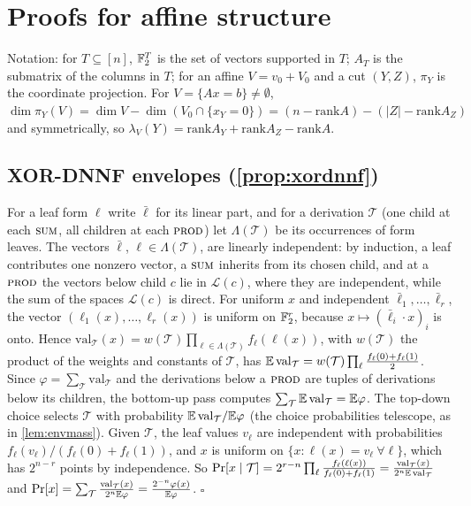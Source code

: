 \section{Proofs for affine structure}\label{app:affine}

Notation: for $T\subseteq[n]$, $\mathbb{F}_2^T$ is the set of vectors supported in $T$; $A_T$
is the submatrix of the columns in $T$; for an affine $V=v_0+V_0$ and a cut $(Y,Z)$,
$\pi_Y$ is the coordinate projection. For $V=\{Ax=b\}\ne\emptyset$,
$\dim\pi_Y(V)=\dim V-\dim(V_0\cap\{x_Y=0\})=(n-\mathrm{rank}A)-(|Z|-\mathrm{rank}A_Z)$
and symmetrically, so
$\lambda_V(Y)=\mathrm{rank}A_Y+\mathrm{rank}A_Z-\mathrm{rank}A$.

\subsection{XOR-DNNF envelopes (\cref{prop:xordnnf})}

For a leaf form $\ell$ write $\bar\ell$ for its linear part, and for a derivation
$\mathcal T$ (one child at each $\textsc{sum}$, all children at each $\textsc{prod}$) let
$\Lambda(\mathcal T)$ be its occurrences of form leaves. The vectors $\bar\ell$,
$\ell\in\Lambda(\mathcal T)$, are linearly independent: by induction, a leaf
contributes one nonzero vector, a $\textsc{sum}$ inherits from its chosen child, and at a
$\textsc{prod}$ the vectors below child $c$ lie in $\mathcal L(c)$, where they are independent,
while the sum of the spaces $\mathcal L(c)$ is direct. For uniform $x$ and independent
$\bar\ell_1,\dots,\bar\ell_r$, the vector $(\ell_1(x),\dots,\ell_r(x))$ is uniform on
$\mathbb{F}_2^r$, because $x\mapsto(\bar\ell_i\cdot x)_i$ is onto. Hence
$\mathrm{val}_{\mathcal T}(x)=w(\mathcal T)\prod_{\ell\in\Lambda(\mathcal T)}f_\ell(\ell(x))$,
with $w(\mathcal T)$ the product of the weights and constants of $\mathcal T$, has
$\mathbb{E}\,\mathrm{val}_{\mathcal T}=w(\mathcal T)\prod_\ell\frac{f_\ell(0)+f_\ell(1)}2$.
Since $\varphi=\sum_{\mathcal T}\mathrm{val}_{\mathcal T}$ and the derivations below a
$\textsc{prod}$ are tuples of derivations below its children, the bottom-up pass computes
$\sum_{\mathcal T}\mathbb{E}\,\mathrm{val}_{\mathcal T}=\mathbb{E}\varphi$. The top-down choice selects
$\mathcal T$ with probability $\mathbb{E}\,\mathrm{val}_{\mathcal T}/\mathbb{E}\varphi$ (the choice
probabilities telescope, as in \cref{lem:envmass}). Given $\mathcal T$, the leaf values
$v_\ell$ are independent with probabilities $f_\ell(v_\ell)/(f_\ell(0)+f_\ell(1))$, and
$x$ is uniform on $\{x:\ell(x)=v_\ell\ \forall\ell\}$, which has $2^{n-r}$ points by
independence. So
$\Pr[x\mid\mathcal T]=2^{r-n}\prod_\ell\frac{f_\ell(\ell(x))}{f_\ell(0)+f_\ell(1)}=
\frac{\mathrm{val}_{\mathcal T}(x)}{2^n\mathbb{E}\,\mathrm{val}_{\mathcal T}}$ and
$\Pr[x]=\sum_{\mathcal T}\frac{\mathrm{val}_{\mathcal T}(x)}{2^n\mathbb{E}\varphi}=
\frac{2^{-n}\varphi(x)}{\mathbb{E}\varphi}$.
\hfill$\square$


